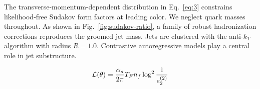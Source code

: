 The transverse-momentum-dependent distribution in Eq.~\eqref{eq:3}
constrains likelihood-free Sudakov form factors at leading color. We
neglect quark masses throughout. As shown in
Fig.~\ref{fig:sudakov-ratio}, a family of robust hadronization
corrections reproduces the groomed jet mass. Jets are clustered with the
anti-$k_T$ algorithm with radius $R = 1.0$. Contrastive autoregressive
models play a central role in jet substructure.

\begin{equation}
  \mathcal{L}(\theta) = \frac{\alpha_s}{2\pi} T_F n_f \log^{2} \frac{1}{e_2^{(2)}}
  \label{eq:4}
\end{equation}

